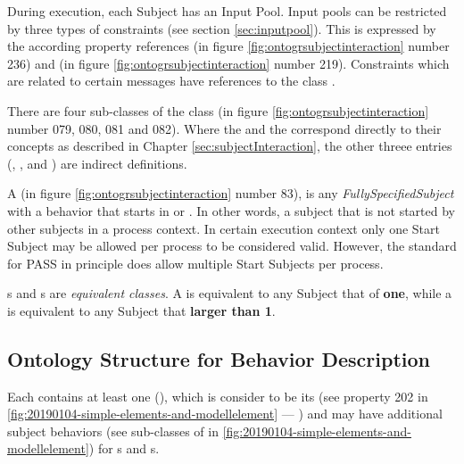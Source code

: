 During execution, each Subject has an Input Pool. Input pools can be restricted by three types of constraints (see section \ref{sec:inputpool}). This is expressed by the according property references  (in figure \ref{fig:ontogrsubjectinteraction} number 236) and  (in figure \ref{fig:ontogrsubjectinteraction} number 219). Constraints which are related to certain messages have references to the class .

There are four sub-classes of the class  (in figure \ref{fig:ontogrsubjectinteraction} number 079, 080, 081 and 082). Where the  and the  correspond directly to their concepts as described in Chapter \ref{sec:subjectInteraction}, the other threee entries (, , and ) are indirect definitions.

A  (in figure \ref{fig:ontogrsubjectinteraction} number 83), is any  \textit{FullySpecifiedSubject} with a behavior that starts in  or . In other words, a subject that is not started by other subjects in a process context. In certain execution context only one Start Subject may be allowed per process to be considered valid. However, the standard for PASS in principle does allow multiple Start Subjects per process.

s and  s are \textit{equivalent classes}. A  is equivalent to any Subject that  of \textbf{one}, while a  is equivalent to any Subject that   \textbf{larger than 1}.


\subsection{Ontology Structure for Behavior Description}

Each  contains at least one  (), which is consider to be its  (see property 202 in \ref{fig:20190104-simple-elements-and-modellelement} ---  ) and may have additional subject behaviors (see sub-classes of  in \ref{fig:20190104-simple-elements-and-modellelement}) for s and s. 

